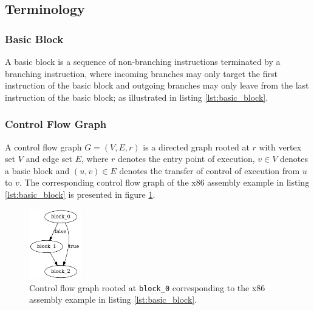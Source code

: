 
\subsection{Terminology}
\label{app:terminology}


\subsubsection{Basic Block}

A basic block is a sequence of non-branching instructions terminated by a branching instruction, where incoming branches may only target the first instruction of the basic block and outgoing branches may only leave from the last instruction of the basic block; as illustrated in listing \ref{lst:basic_block}.




\subsubsection{Control Flow Graph}

A control flow graph $G = (V, E, r)$ is a directed graph rooted at $r$ with vertex set $V$ and edge set $E$, where $r$ denotes the entry point of execution, $v \in V$ denotes a basic block and $(u, v) \in E$ denotes the transfer of control of execution from $u$ to $v$. The corresponding control flow graph of the x86 assembly example in listing \ref{lst:basic_block} is presented in figure \ref{fig:control_flow_graph}.

\begin{figure}[htbp]
	\centering
	\includegraphics[width=0.2\textwidth]{inc/appendices/vocabulary/control_flow_graph.png}
	\caption{Control flow graph rooted at \texttt{block\_0} corresponding to the x86 assembly example in listing \ref{lst:basic_block}.}
	\label{fig:control_flow_graph}
\end{figure}

